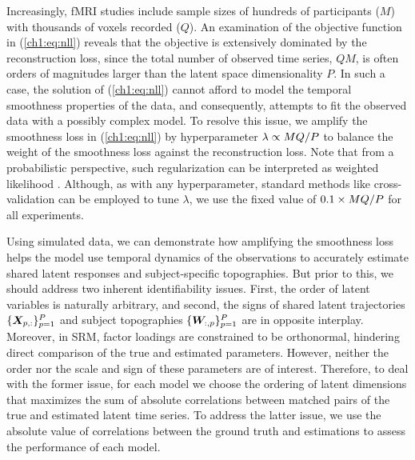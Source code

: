 Increasingly, fMRI studies include sample sizes of hundreds of participants ($M$) with thousands of voxels recorded ($Q$). An examination of the objective function in (\ref{ch1:eq:nll}) reveals that the objective is extensively dominated by the reconstruction loss, since the total number of observed time series, $Q M$, is often orders of magnitudes larger than the latent space dimensionality $P$. In such a case, the solution of (\ref{ch1:eq:nll}) cannot afford to model the temporal smoothness properties of the data, and consequently, attempts to fit the observed data with a possibly complex model. To resolve this issue, we amplify the smoothness loss in (\ref{ch1:eq:nll}) by hyperparameter $\lambda \propto MQ/P$ to balance the weight of the smoothness loss against the reconstruction loss. Note that from a probabilistic perspective, such regularization can be interpreted as weighted likelihood \cite{weightedlikelihood}. Although, as with any hyperparameter, standard methods like cross-validation can be employed to tune $\lambda$, we use the fixed value of $0.1 \times MQ/P$ for all experiments. 

Using simulated data, we can demonstrate how amplifying the smoothness loss helps the model use temporal dynamics of the observations to accurately estimate shared latent responses and subject-specific topographies. But prior to this, we should address two inherent identifiability issues. First, the order of latent variables is naturally arbitrary, and second, the signs of shared latent trajectories $\{\bm{X}_{p,:}\}_{p=1}^{P}$ and subject topographies $\{\bm{W}_{:,p}\}_{p=1}^{P}$ are in opposite interplay. Moreover, in SRM, factor loadings are constrained to be orthonormal, hindering direct comparison of the true and estimated parameters. However, neither the order nor the scale and sign of these parameters are of interest. Therefore, to deal with the former issue, for each model we choose the ordering of latent dimensions that maximizes the sum of absolute correlations between matched pairs of the true and estimated latent time series. To address the latter issue, we use the absolute value of correlations between the ground truth and estimations to assess the performance of each model. 

